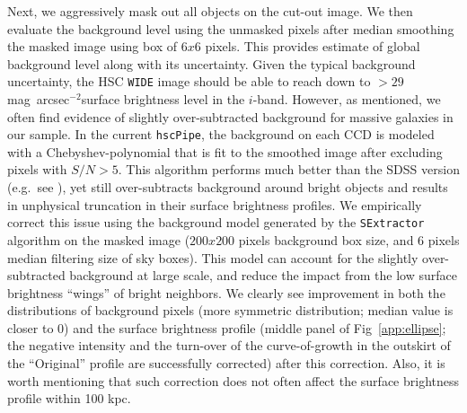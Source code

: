 \documentclass[a4paper,fleqn,usenatbib]{mnras}
\def\sb{mag~arcsec$^{-2}$}
\begin{document}
    Next, we aggressively mask out all objects on the cut-out image.  
    We then evaluate the background level using the unmasked pixels after median 
    smoothing the masked image using box of $6x6$ pixels.
    This provides estimate of global background level along with its uncertainty. 
    Given the typical background uncertainty, the HSC \texttt{WIDE} image should be 
    able to reach down to $> 29$ \sb surface brightness level in the $i$-band.  
    However, as mentioned, we often find evidence of slightly over-subtracted 
    background for massive galaxies in our sample. 
    In the current \texttt{hscPipe}, the background on each CCD is modeled with a 
    Chebyshev-polynomial that is fit to the smoothed image after excluding pixels 
    with $S/N >5$.
    This algorithm performs much better than the SDSS version 
    (e.g.\ see \citealt{Blanton2011}), yet still over-subtracts background around 
    bright objects and results in unphysical truncation in their surface brightness 
    profiles.
    We empirically correct this issue using the background model generated by 
    the \texttt{SExtractor} algorithm on the masked image 
    ($200x200$ pixels background box size, and 6 pixels median filtering size of 
    sky boxes).
    This model can account for the slightly over-subtracted background at large scale,
    and reduce the impact from the low surface brightness ``wings'' of bright 
    neighbors. 
    We clearly see improvement in both the distributions of background pixels 
    (more symmetric distribution; median value is closer to 0) and the surface 
    brightness profile (middle panel of Fig~\ref{app:ellipse}; the negative intensity 
    and the turn-over of the curve-of-growth in the outskirt of the ``Original'' 
    profile are successfully corrected) after this correction.
    Also, it is worth mentioning that such correction does not often affect the 
    surface brightness profile within 100 kpc. 
    
\end{document}
